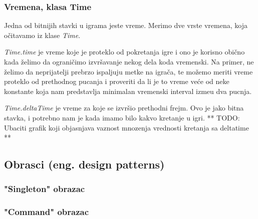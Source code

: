 \subsubsection{Vremena, klasa Time}
Jedna od bitnijih stavki u igrama jeste vreme. Merimo dve vrste vremena, koja o\v{c}itavamo iz klase \emph{Time}.

\emph{Time.time} je vreme koje je proteklo od pokretanja igre i ono je korisno
obi\v{c}no kada \v{z}elimo da ograni\v{c}imo izvr\v{s}avanje nekog dela koda vremenski.
Na primer, ne \v{z}elimo da neprijatelji prebrzo ispaljuju metke na igra\v{c}a, te mo\v{z}emo meriti
vreme proteklo od prethodnog pucanja i proveriti da li je to vreme ve\'ce od neke konstante
koja nam predstavlja minimalan vremenski interval izme\dj u dva pucnja.

\emph{Time.deltaTime} je vreme za koje se izvr\v{s}io prethodni frejm. Ovo je jako bitna stavka,
i potrebno nam je kada imamo bilo kakvo kretanje u igri. \color{red} ** TODO: Ubaciti grafik koji objasnjava vaznost mnozenja vrednosti kretanja sa deltatime **



\subsection{Obrasci (eng. design patterns)}
\subsubsection{"Singleton" obrazac}
\subsubsection{"Command" obrazac}
